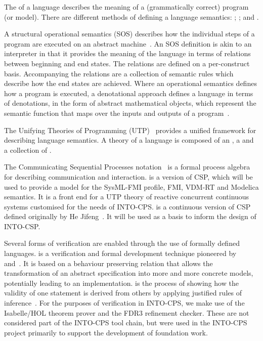 The  of a language describes the meaning of a (grammatically correct) program~\cite{Nielson&92} (or model). There are different methods of defining a language semantics: ; ; and .

A structural operational semantics (SOS) describes how the individual steps of a program are executed on an abstract machine~\cite{Plotkin81}. An SOS definition is akin to an interpreter in that it provides the meaning of the language in terms of relations between beginning and end states. The relations are defined on a per-construct basis. Accompanying the relations are a collection of semantic rules which describe how the end states are achieved. Where an operational semantics defines how a program is executed, a denotational approach defines a language in terms of denotations, in the form of abstract mathematical objects, which represent the semantic function that maps over the inputs and outputs of a program~\cite{Scott&71}.

The Unifying Theories of Programming (UTP)~\cite{Hoare&98} provides a unified framework for describing language semantics. A theory of a language is composed of an , a  and a collection of .

The Communicating Sequential Processes  notation~\cite{Hoare85} is a formal process algebra for describing  communication  and interaction.
 is a version of CSP, which will be used to provide a model for the SysML-FMI profile, FMI, VDM-RT and Modelica semantics. It is a front end for a UTP theory of reactive concurrent continuous systems customised for the needs of INTO-CPS.  is a continuous version of CSP defined originally by He Jifeng~\cite{Jifeng94}. It will be used as a basis to inform the design of INTO-CSP.

Several forms of verification are enabled through the use of formally defined languages.   is a verification and formal development technique pioneered by~\cite{Back&98} and~\cite{Morgan90a}. It is based on a behaviour preserving relation that allows the transformation of an abstract specification into more and more concrete models, potentially leading to an implementation.  is the process of showing how the validity of one statement is derived from others by applying justified rules of inference~\cite{Bicarregui&94}. For the purposes of verification in INTO-CPS, we make use of the Isabelle/HOL theorem prover and the FDR3 refinement checker. These are not considered part of the INTO-CPS tool chain, but were used in the INTO-CPS project primarily to support the development of foundation work.



